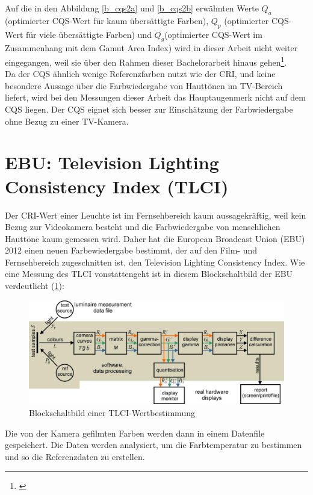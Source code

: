 Auf die in den Abbildung \ref{b_cqs2a} und \ref{b_cqs2b} erwähnten Werte $Q_{a}$ (optimierter CQS-Wert für kaum übersättigte Farben), $Q_{p}$ (optimierter CQS-Wert für viele übersättigte Farben) und $Q_{g}$(optimierter CQS-Wert im Zusammenhang mit dem Gamut Area Index) wird in dieser Arbeit nicht weiter eingegangen, weil sie über den Rahmen dieser Bachelorarbeit hinaus gehen\footnote{\cite[60-62]{khanh}}. \\
Da der CQS ähnlich wenige Referenzfarben nutzt wie der CRI, und keine besondere Aussage über die Farbwiedergabe von Hauttönen im TV-Bereich liefert, wird bei den Messungen dieser Arbeit das Hauptaugenmerk nicht auf dem CQS liegen. Der CQS eignet sich besser zur Einschätzung der Farbwiedergabe ohne Bezug zu einer TV-Kamera. 


\newpage 
\section{EBU: Television Lighting Consistency Index (TLCI)} \label{sec_tlci}
Der CRI-Wert einer Leuchte ist im Fernsehbereich kaum aussagekräftig, weil kein Bezug zur Videokamera besteht und die Farbwiedergabe von menschlichen Hauttöne kaum gemessen wird. Daher hat die European Broadcast Union (EBU) 2012 einen neuen Farbewiedergabe bestimmt, der auf den Film- und Fernsehbereich zugeschnitten ist, den Television Lighting Consistency Index.  
Wie eine Messung des TLCI vonstattengeht ist in diesem Blockschaltbild der EBU verdeutlicht (\ref{b_tlci1}):

\begin{figure}[htp]     %
\centering
\includegraphics[width=1.0\textwidth]{bilder/tlci1} 
\caption {Blockschaltbild einer TLCI-Wertbestimmung \protect\footnotemark}\label{b_tlci1}
\end{figure}
Die von der Kamera gefilmten Farben werden dann in einem Datenfile gespeichert. Die Daten werden analysiert, um die Farbtemperatur zu bestimmen und so die Referenzdaten zu erstellen.

